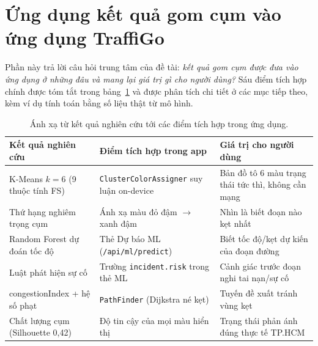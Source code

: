 \section{Ứng dụng kết quả gom cụm vào ứng dụng TraffiGo}
Phần này trả lời câu hỏi trung tâm của đề tài: \textit{kết quả gom cụm được đưa vào ứng dụng ở những đâu và mang lại giá trị gì cho người dùng?} Sáu điểm tích hợp chính được tóm tắt trong bảng~\ref{tab:mapping} và được phân tích chi tiết ở các mục tiếp theo, kèm ví dụ tính toán bằng số liệu thật từ mô hình.

\begin{table}[h!]
\centering
\caption{Ánh xạ từ kết quả nghiên cứu tới các điểm tích hợp trong ứng dụng.}
\label{tab:mapping}
\small
\begin{tabularx}{\textwidth}{lXX}
\toprule
\textbf{Kết quả nghiên cứu} & \textbf{Điểm tích hợp trong app} & \textbf{Giá trị cho người dùng}\\
\midrule
K-Means $k=6$ (9 thuộc tính FS) & \texttt{ClusterColorAssigner} suy luận on-device & Bản đồ tô 6 màu trạng thái tức thì, không cần mạng\\
Thứ hạng nghiêm trọng cụm & Ánh xạ màu đỏ đậm $\rightarrow$ xanh đậm & Nhìn là biết đoạn nào kẹt nhất\\
Random Forest dự đoán tốc độ & Thẻ Dự báo ML (\texttt{/api/ml/predict}) & Biết tốc độ/kẹt dự kiến của đoạn đường\\
Luật phát hiện sự cố & Trường \texttt{incident.risk} trong thẻ ML & Cảnh giác trước đoạn nghi tai nạn/sự cố\\
congestionIndex + hệ số phạt & \texttt{PathFinder} (Dijkstra né kẹt) & Tuyến đề xuất tránh vùng kẹt\\
Chất lượng cụm (Silhouette 0{,}42) & Độ tin cậy của mọi màu hiển thị & Trạng thái phản ánh đúng thực tế TP.HCM\\
\bottomrule
\end{tabularx}
\end{table}

